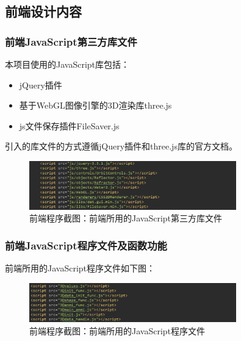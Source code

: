 \documentclass[a4paper]{ctexart}
\begin{document}
\begin{spacing}{1.25}
\subsection{前端设计内容}
\subsubsection{前端JavaScript第三方库文件}
本项目使用的JavaScript库包括：

\begin{itemize}
	\item jQuery插件
	\item 基于WebGL图像引擎的3D渲染库three.js
	\item js文件保存插件FileSaver.js
\end{itemize}

引入的库文件的方式遵循jQuery插件和three.js库的官方文档。
\begin{figure}[htbp]
	\centering
	\includegraphics [width=0.8\textwidth]{figure//forw1.png}
	\caption{前端程序截图：前端所用的JavaScript第三方库文件}
\end{figure}

\subsubsection{前端JavaScript程序文件及函数功能}
前端所用的JavaScript程序文件如下图：
\begin{figure}[htbp]
	\centering
	\includegraphics [width=0.8\textwidth]{figure//forw2.png}
	\caption{前端程序截图：前端所用的JavaScript程序文件}
\end{figure}


\end{spacing}
\end{document}
